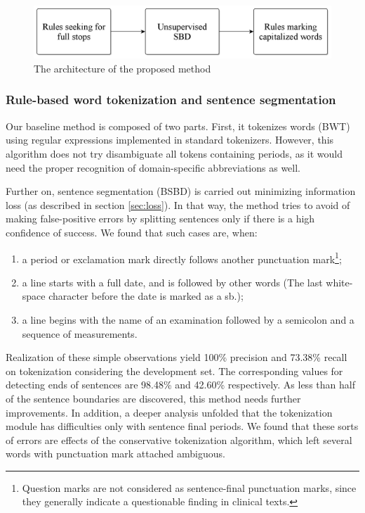 \begin{figure}[H]
  \centering
  \includegraphics[scale=0.2]{Clinical/clin_segm_arch.png} 
  \caption{The architecture of the proposed method}
  \label{fig:clin-segment-arch}
\end{figure}

\subsubsection{Rule-based word tokenization and sentence segmentation}

Our baseline method is composed of two parts. 
First, it tokenizes words (BWT) using regular expressions implemented in standard tokenizers. %
However, this algorithm does not try disambiguate all tokens containing periods, as it would need the proper recognition of domain-specific abbreviations as well. %

Further on, sentence segmentation (BSBD) is carried out minimizing information loss (as described in section \ref{sec:loss}). 
In that way, the method tries to avoid of making false-positive errors by splitting sentences only if there is a high confidence of success. 
We found that such cases are, when:
\begin{enumerate} 
 \item a period or exclamation mark directly follows another punctuation mark\footnote{Question marks are not considered as sentence-final punctuation marks, since they generally indicate a questionable finding in clinical texts.};
 \item a line starts with a full date, and is followed by other words (The last white-space character before the date is marked as a \gls{sb}.);
 \item a line begins with the name of an examination followed by a semicolon and a sequence of measurements.
\end{enumerate}

Realization of these simple observations yield 100\% precision and 73.38\% recall on tokenization considering the development set. 
The corresponding values for detecting ends of sentences are 98.48\% and 42.60\% respectively. 
As less than half of the sentence boundaries are discovered, this method needs further improvements.
In addition, a deeper analysis unfolded that the tokenization module has difficulties only with sentence final periods. 
We found that these sorts of errors are effects of the conservative tokenization algorithm, which left several words with punctuation mark attached ambiguous.

